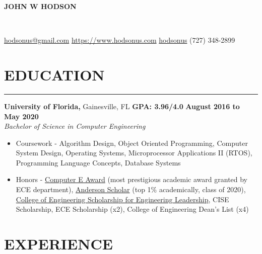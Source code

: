 \documentclass[11pt]{article}
\newcommand*{\sectionheaderspace}{\vspace{.40cm}}
\newcommand*{\subsectionspace}{\vspace{.20cm}}
\newcommand*{\headerspace}{\vspace{.05cm}}
\begin{document}
	\noindent\centerline{ \huge\textbf{JOHN W HODSON} }\\
	\headerspace

	\noindent
	\faEnvelopeSquare \space \href{mailto:hodsonus@gmail.com}{hodsonus@gmail.com} \hspace*{\fill}
	\faHome \space \href{https://www.hodsonus.com}{https://www.hodsonus.com} \hspace*{\fill}
	\faGithub \space \href{https://github.com/hodsonus}{hodsonus} \hspace*{\fill}
	\faMobilePhone \space (727) 348-2899\\
	\headerspace

	\section*{EDUCATION}

	\hrule \relax
	\sectionheaderspace

	\noindent \textbf{University of Florida,} Gainesville, FL
	\hfill\textbf{GPA: 3.96/4.0}
	\hfill\textbf{August 2016 to May 2020}\\
	\textit{Bachelor of Science in Computer Engineering}
	\begin{itemize}[noitemsep,nolistsep, label = {-}]
		\item  Coursework - 
			Algorithm Design,
			Object Oriented Programming,
			Computer System Design,
			Operating Systems,
			Microprocessor Applications II (RTOS),
			Programming Language Concepts,
			Database Systems
		\item  Honors - 
			\href{https://www.ece.ufl.edu/people/student-awards/}
					{Computer E Award} (most prestigious academic award granted by ECE department),
			\href{https://clas.ufl.edu/undergraduate/anderson-scholars/}
					{Anderson Scholar} (top 1\% academically, class of 2020),
			\href{https://www.eng.ufl.edu/leadership/students/scholarships/thomas-o-hunter-leadership/}
					{College of Engineering Scholarship for Engineering Leadership},
			CISE Scholarship,
			ECE Scholarship (x2),
			College of Engineering Dean\rq s List (x4)
	\end{itemize}
	\subsectionspace

	\section*{EXPERIENCE}
\end{document}
